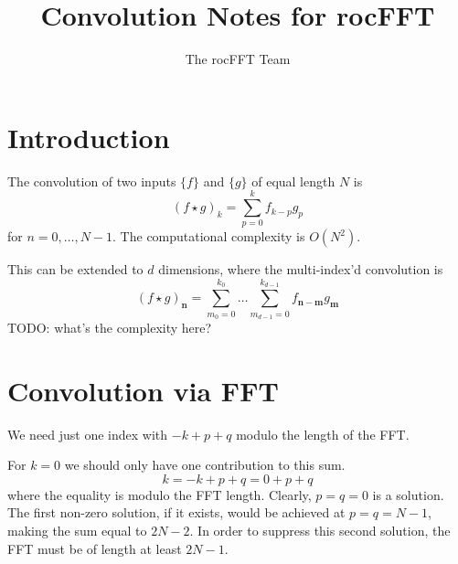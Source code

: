 \documentclass[12pt]{article}
\title{Convolution Notes for rocFFT}
\author{The rocFFT Team}
\renewcommand{\(}{\left(}
\renewcommand{\)}{\right)}
\begin{document}
\maketitle

\section{Introduction}


The convolution of two inputs $\{f\}$ and $\{g\}$ of equal length $N$ is
\begin{dmath}
  \(f\star{}g\)_k = \sum_{p=0}^{k}f_{k-p}g_p
\end{dmath}
for $n=0,\dots,N-1$.  The computational complexity is $O\(N^2\)$.

This can be extended to $d$ dimensions, where the multi-index'd convolution is
\begin{dmath}
  \(f\star{}g\)_{\pmb{n}} = \sum_{m_0=0}^{k_0}\dots{}\sum_{m_{d-1}=0}^{k_{d-1}} f_{\pmb{n}-\pmb{m}}g_{\pmb{m}}
\end{dmath}
TODO: what's the complexity here?

\section{Convolution via FFT}

We need just one index with $-k +p +q$ modulo the length of the FFT.

For $k=0$ we should only have one contribution to this sum.
\begin{dmath}
  k  = -k + p + q = 0 + p + q
\end{dmath}
where the equality is modulo the FFT length.  Clearly, $p=q=0$ is a
solution.  The first non-zero solution, if it exists, would be
achieved at $p=q=N-1$, making the sum equal to $2N-2$.  In order to
suppress this second solution, the FFT must be of length at least
$2N-1$.

    
\end{document}
